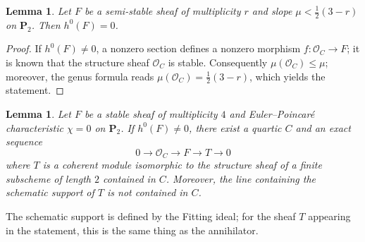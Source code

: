 \documentclass[12pt,english]{smfart}%
\theoremstyle{plain}
\newtheorem{lemma}[theorem]{Lemma}
\theoremstyle{definition}
\theoremstyle{remark}
\newcommand{\PP}{\mathbf{P}}
\newcommand{\Oo}{\mathcal{O}}
\begin{document}
\begin{lemma}\label{lem:h0-vanish}
Let $F$ be a semi-stable sheaf of multiplicity $r$ and slope $\mu < \tfrac12(3-r)$ on $\PP_2$. Then $h^0(F)=0$.
\end{lemma}

\begin{proof}
If $h^0(F)\neq 0$, a nonzero section defines a nonzero morphism $f:\Oo_C\to F$; it is known \cite{Sor} that the structure sheaf $\Oo_C$ is stable. Consequently $\mu(\Oo_C)\le \mu$; moreover, the genus formula reads $\mu(\Oo_C)=\tfrac12(3-r)$, which yields the statement.
\end{proof}

\begin{lemma}\label{lem:quartic-ext}
Let $F$ be a stable sheaf of multiplicity $4$ and Euler--Poincar\'e characteristic $\chi = 0$ on $\PP_2$. If $h^0(F)\neq 0$, there exist a quartic $C$ and an exact sequence
\[
0 \longrightarrow \Oo_C \longrightarrow F \longrightarrow T \longrightarrow 0
\]
where $T$ is a coherent module isomorphic to the structure sheaf of a finite subscheme of length $2$ contained in $C$. Moreover, the line containing the schematic support of $T$ is not contained in $C$.
\end{lemma}

The schematic support is defined by the Fitting ideal; for the sheaf $T$ appearing in the statement, this is the same thing as the annihilator.
\end{document}
